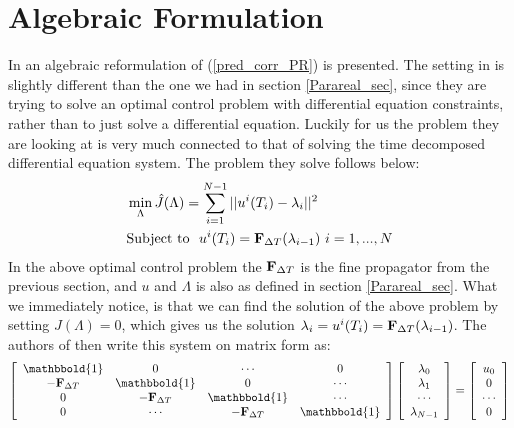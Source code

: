 \section{Algebraic Formulation}\label{algebraic_sec}
In \cite{maday2002parareal} an algebraic reformulation of (\ref{pred_corr_PR}) is presented. The setting in \cite{maday2002parareal} is slightly different than the one we had in section \ref{Parareal_sec}, since they are trying to solve an optimal control problem with differential equation constraints, rather than to just solve a differential equation. Luckily for us the problem they are looking at is very much connected to that of solving the time decomposed differential equation system. The problem they solve follows below:
\begin{align*}
&\min_{\Lambda}\hat{J}(\Lambda) = \sum_{i=1}^{N-1} ||u^{i}(T_{i})-\lambda_{i}||^2 \\
&\textrm{Subject to } \ u^{i}(T_{i}) = \bold F_{\Delta T}(\lambda_{i-1}) \ i=1,...,N
\end{align*}
In the above optimal control problem the $\bold F_{\Delta T}$ is the fine propagator from the previous section, and $u$ and $\Lambda$ is also as defined in section \ref{Parareal_sec}. What we immediately notice, is that we can find the solution of the above problem by setting $J(\Lambda)=0$, which gives us the solution $\lambda_{i}= u^{i}(T_{i})=\bold F_{\Delta T}(\lambda_{i-1})$. The authors of \cite{maday2002parareal} then write this system on matrix form as:
\begin{align}
  \left[ \begin{array}{cccc}
   \mathbbold{1} & 0 & \cdots & 0 \\  
   -\bold{F}_{\Delta T} & \mathbbold{1} & 0 & \cdots \\ 
   0 &-\bold{F}_{\Delta T} & \mathbbold{1}  & \cdots \\
   0 &\cdots &-\bold{F}_{\Delta T} & \mathbbold{1}  \\
   \end{array}  \right] 
   \left[ \begin{array}{c}
   \lambda_0 \\
   \lambda_1 \\
   \cdots \\
   \lambda_{N-1} \\
   \end{array}  \right] =
   \left[ \begin{array}{c}
   u_0 \\
   0 \\
   \cdots \\
   0 \\
   \end{array}  \right] \label{vir_mat_form_sys }
\end{align}
